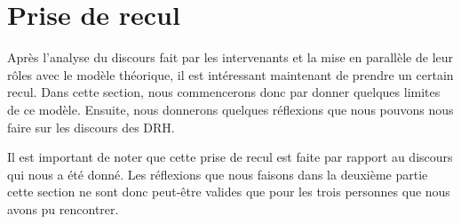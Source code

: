\section{Prise de recul}

Après l'analyse du discours fait par les intervenants et la mise en parallèle de leur rôles avec le modèle théorique, il est intéressant maintenant de prendre un certain recul. Dans cette section, nous commencerons donc par donner quelques limites de ce modèle. Ensuite, nous donnerons quelques réflexions que nous pouvons nous faire sur les discours des DRH.\newline

Il est important de noter que cette prise de recul est faite par rapport au discours qui nous a été donné. Les réflexions que nous faisons dans la deuxième partie cette section ne sont donc peut-être valides que pour les trois personnes que nous avons pu rencontrer. \newline